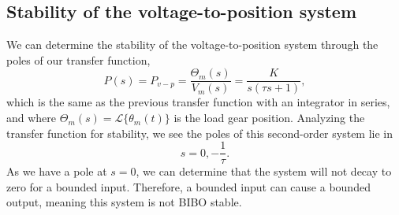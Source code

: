 \documentclass{article}
\begin{document}
\subsection{Stability of the voltage-to-position system}
We can determine the stability of the voltage-to-position system through the poles of our transfer function,
\begin{equation}
    P(s)=P_{v-p}=\frac{\Theta_m(s)}{V_m(s)}=\frac{K}{s(\tau s+1)},
\end{equation}
which is the same as the previous transfer function with an integrator in series, and where $\Theta_m(s)=\mathcal{L}\{\theta_m(t)\}$ is the load gear position. Analyzing the transfer function for stability, we see the poles of this second-order system lie in
\begin{equation}
    s=0,-\frac{1}{\tau}.
\end{equation}
As we have a pole at $s=0$, we can determine that the system will not decay to zero for a bounded input. Therefore, a bounded input can cause a bounded output, meaning this system is not BIBO stable.
\end{document}

